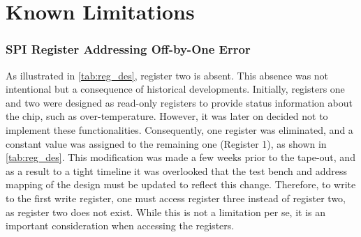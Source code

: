 \section{Known Limitations}

\subsubsection{SPI Register Addressing Off-by-One Error}
As illustrated in \autoref{tab:reg_des}, register two is absent. This absence was not intentional but a consequence of historical developments. Initially, registers one and two were designed as read-only registers to provide status information about the chip, such as over-temperature. However, it was later on decided not to implement these functionalities. Consequently, one register was eliminated, and a constant value was assigned to the remaining one (Register 1), as shown in \autoref{tab:reg_des}.
This modification was made a few weeks prior to the tape-out, and as a result to a tight timeline it was overlooked that the test bench and address mapping of the design must be updated to reflect this change. Therefore, to write to the first write register, one must access register three instead of register two, as register two does not exist. While this is not a limitation per se, it is an important consideration when accessing the registers.

